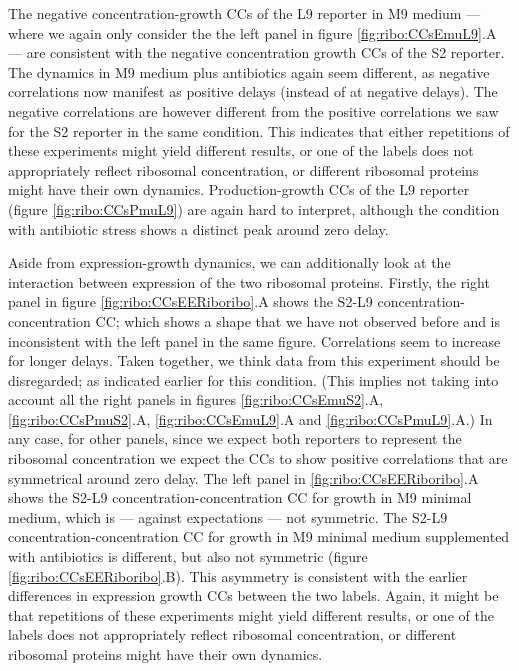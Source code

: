 The negative concentration-growth CCs of the L9 reporter in M9 medium --- where we again only consider the the left panel in figure \ref{fig:ribo:CCsEmuL9}.A --- are consistent with the negative concentration growth CCs of the S2 reporter.  
The dynamics in M9 medium plus antibiotics again seem different, as negative correlations now manifest as positive delays (instead of at negative delays).
The negative correlations are however different from the positive correlations we saw for the S2 reporter in the same condition.
%
This indicates that either repetitions of these experiments might yield different results, or one of the labels does not appropriately reflect ribosomal concentration, or different ribosomal proteins might have their own dynamics.
%
Production-growth CCs of the L9 reporter (figure \ref{fig:ribo:CCsPmuL9}) are again hard to interpret, although the condition with antibiotic stress shows a distinct peak around zero delay.

Aside from expression-growth dynamics, we can additionally look at the interaction between expression of the two ribosomal proteins. 
% 
Firstly, the right panel in figure \ref{fig:ribo:CCsEERiboribo}.A shows the S2-L9 concentration-concentration CC; which shows a shape that we have not observed before and is inconsistent with the left panel in the same figure. Correlations seem to increase for longer delays. 
Taken together, we think data from this experiment should be disregarded; as indicated earlier for this condition.
(This implies not taking into account all the right panels in figures \ref{fig:ribo:CCsEmuS2}.A, \ref{fig:ribo:CCsPmuS2}.A, \ref{fig:ribo:CCsEmuL9}.A and \ref{fig:ribo:CCsPmuL9}.A.)
%
In any case, for other panels, since we expect both reporters to represent the ribosomal concentration we expect the CCs to show positive correlations that are symmetrical around zero delay.
%
The left panel in \ref{fig:ribo:CCsEERiboribo}.A shows the S2-L9 concentration-concentration CC for growth in M9 minimal medium, which is --- against expectations --- not symmetric.
The S2-L9 concentration-concentration CC for growth in M9 minimal medium supplemented with antibiotics is different, but also not symmetric (figure \ref{fig:ribo:CCsEERiboribo}.B).
%
This asymmetry is consistent with the earlier differences in expression growth CCs between the two labels.
Again, it might be that 
repetitions of these experiments might yield different results, or one of the labels does not appropriately reflect ribosomal concentration, or different ribosomal proteins might have their own dynamics.



